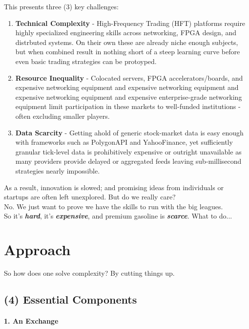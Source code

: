 \documentclass[12pt]{article}
\begin{document}
This presents three (3) key challenges: 
\begin{enumerate}
  \item \textbf{Technical Complexity} - High-Frequency Trading (HFT) platforms require highly specialized engineering skills across networking, FPGA design, and distrbuted systems. On their own these are already niche enough subjects, but when combined result in nothing short of a steep learning curve before even basic trading strategies can be protoyped.
  \item \textbf{Resource Inequality} - Colocated servers, FPGA accelerators/boards, and expensive networking equipment  and expensive networking equipment  and expensive networking equipment  and expensive enterprise-grade networking equipment limit participation in these markets to well-funded institutions - often excluding smaller players.
  \item \textbf{Data Scarcity} - Getting ahold of generic stock-market data is easy enough with frameworks such as PolygonAPI and YahooFinance, yet sufficiently granular tick-level data is prohibitively expensive or outright unavailable as many providers provide delayed or aggregated feeds leaving sub-millisecond strategies nearly impossible. 
\end{enumerate}

As a result, innovation is slowed; and promising ideas from individuals or startups are often left unexplored.
But do we really care? \\ No. We just want to prove we have the skills to run with the big leagues.
\\
So it's \textbf{\emph{hard}}, it's \textbf{\emph{expensive}}, and premium gasoline is \textbf{\emph{scarce}}. What to do...
\clearpage


\section*{Approach}
So how does one solve complexity? By cutting things up.
\subsection*{(4) Essential Components}

\paragraph {1. An Exchange}\
\end{document}
